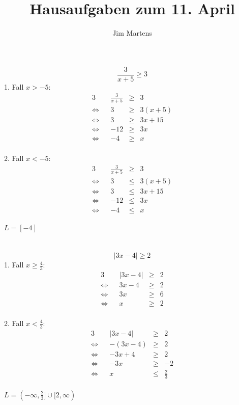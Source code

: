 \documentclass[10pt,a4paper,oneside,ngerman,numbers=noenddot]{scrartcl}
\begin{document}
\author{Jim Martens}
\title{Hausaufgaben zum 11. April}
\maketitle
\section{} %
\begin{equation*}
\frac{3}{x+5} \geq 3
\end{equation*}
1. Fall $x > -5$:\\
\begin{alignat*}{3}
&& \frac{3}{x+5} &\geq & 3 \\
\Leftrightarrow && 3 &\geq & 3(x+5) \\
\Leftrightarrow && 3 &\geq & 3x + 15 \\
\Leftrightarrow && -12 &\geq & 3x \\
\Leftrightarrow && -4 &\geq & x
\end{alignat*}
\\
2. Fall $x < -5$:\\
\begin{alignat*}{3}
&& \frac{3}{x+5} &\geq & 3 \\
\Leftrightarrow && 3 &\leq & 3(x+5) \\
\Leftrightarrow && 3 &\leq & 3x + 15 \\
\Leftrightarrow && -12 &\leq & 3x \\
\Leftrightarrow && -4 &\leq & x
\end{alignat*}
\\
$L = [-4]$
\section{} %
\begin{equation*}
|3x-4| \geq 2
\end{equation*}
1. Fall $x \geq \frac{4}{3}$:\\
\begin{alignat*}{3}
&& |3x-4| &\geq & 2 \\
\Leftrightarrow && 3x-4 &\geq & 2 \\
\Leftrightarrow && 3x &\geq & 6 \\
\Leftrightarrow && x &\geq & 2
\end{alignat*}
\\
2. Fall $x < \frac{4}{3}$:\\
\begin{alignat*}{3}
&& |3x-4| &\geq & 2 \\
\Leftrightarrow && -(3x-4) &\geq & 2 \\
\Leftrightarrow && -3x + 4 &\geq & 2 \\
\Leftrightarrow && -3x &\geq & -2 \\
\Leftrightarrow && x &\leq & \frac{2}{3}
\end{alignat*}
\\
$L = (-\infty,\frac{2}{3}] \cup [2,\infty)$
\end{document}
